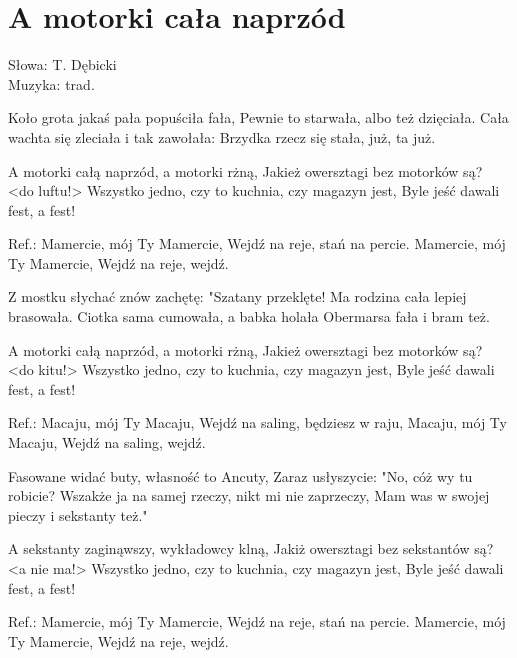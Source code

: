 \section{A motorki cała naprzód}

Słowa: T. Dębicki\\
Muzyka:  trad.

Koło grota jakaś pała popuściła fała,
Pewnie to starwała, albo też dzięciała.
Cała wachta się zleciała i tak zawołała:
Brzydka rzecz się stała, już, ta już.

A motorki całą naprzód, a motorki rżną,
Jakież owersztagi bez motorków są?  <do luftu!>
Wszystko jedno, czy to kuchnia, czy magazyn jest,
Byle jeść dawali fest, a fest!

Ref.: Mamercie, mój Ty Mamercie,
Wejdź na reje, stań na percie.
Mamercie, mój Ty Mamercie,
Wejdź na reje, wejdź.

Z mostku słychać znów zachętę: "Szatany przeklęte!
Ma rodzina cała lepiej brasowała.
Ciotka sama cumowała, a babka holała
Obermarsa fała i bram też.

A motorki całą naprzód, a motorki rżną,
Jakież owersztagi bez motorków są?  <do kitu!>
Wszystko jedno, czy to kuchnia, czy magazyn jest,
Byle jeść dawali fest, a fest!

Ref.: Macaju, mój Ty Macaju,
Wejdź na saling, będziesz w raju,
Macaju, mój Ty Macaju,
Wejdź na saling, wejdź.

Fasowane widać buty, własność to Ancuty,
Zaraz usłyszycie: "No, cóż wy tu robicie?
Wszakże ja na samej rzeczy, nikt mi nie zaprzeczy,
Mam was w swojej pieczy i sekstanty też."

A sekstanty zaginąwszy, wykładowcy klną,
Jakiż owersztagi bez sekstantów są?  <a nie ma!>
Wszystko jedno, czy to kuchnia, czy magazyn jest,
Byle jeść dawali fest, a fest!

Ref.: Mamercie, mój Ty Mamercie,
Wejdź na reje, stań na percie.
Mamercie, mój Ty Mamercie,
Wejdź na reje, wejdź.